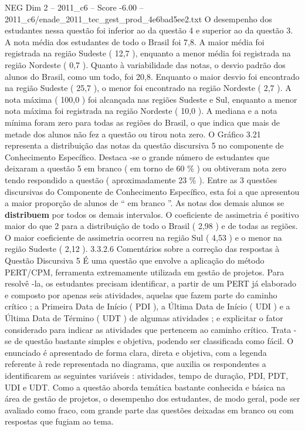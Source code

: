 \begin{textsample}{NEG Dim 2 – 2011\_c6 – Score -6.00 – 2011\_c6/enade\_2011\_tec\_gest\_prod\_4e6bad5ee2.txt}
O desempenho dos estudantes nessa questão foi inferior ao da questão 4 e superior ao da questão 3.
A nota média dos estudantes de todo o Brasil foi 7,8.
A maior média foi registrada na região Sudeste ( 12,7 ), enquanto a menor média foi registrada na região Nordeste ( 0,7 ).
Quanto à variabilidade das notas, o desvio padrão dos alunos do Brasil, como um todo, foi 20,8.
Enquanto o maior desvio foi encontrado na região Sudeste ( 25,7 ), o menor foi encontrado na região Nordeste ( 2,7 ).
A nota máxima ( 100,0 ) foi alcançada nas regiões Sudeste e Sul, enquanto a menor nota máxima foi registrada na região Nordeste ( 10,0 ).
A mediana e a nota mínima foram zero para todas as regiões do Brasil, o que indica que mais de metade dos alunos não fez a questão ou tirou nota zero.
O Gráfico 3.21 representa a distribuição das notas da questão discursiva 5 no componente de Conhecimento Específico.
Destaca -se o grande número de estudantes que deixaram a questão 5 em branco ( em torno de 60 \% ) ou obtiveram nota zero tendo respondido a questão ( aproximadamente 23 \% ).
Entre as 3 questões discursivas do Componente de Conhecimento Específico, esta foi a que apresentou a maior proporção de alunos de “ em branco ”.
As notas dos demais alunos se \textbf{distribuem} por todos os demais intervalos.
O coeficiente de assimetria é positivo maior do que 2 para a distribuição de todo o Brasil ( 2,98 ) e de todas as regiões.
O maior coeficiente de assimetria ocorreu na região Sul ( 4,53 ) e o menor na região Sudeste ( 2,12 ). 3.3.2.6 Comentários sobre a correção das respostas à Questão Discursiva 5 É uma questão que envolve a aplicação do método PERT/CPM, ferramenta extremamente utilizada em gestão de projetos.
Para resolvê -la, os estudantes precisam identificar, a partir de um PERT já elaborado e composto por apenas seis atividades, aquelas que fazem parte do caminho crítico ; a Primeira Data de Início ( PDI ), a Última Data de Início ( UDI ) e a Última Data de Término ( UDT ) de algumas atividades ; e explicitar o fator considerado para indicar as atividades que pertencem ao caminho crítico.
Trata -se de questão bastante simples e objetiva, podendo ser classificada como fácil.
O enunciado é apresentado de forma clara, direta e objetiva, com a legenda referente à rede representada no diagrama, que auxilia os respondentes a identificarem as seguintes variáveis : atividades, tempo de duração, PDI, PDT, UDI e UDT.
Como a questão aborda temática bastante conhecida e básica na área de gestão de projetos, o desempenho dos estudantes, de modo geral, pode ser avaliado como fraco, com grande parte das questões deixadas em branco ou com respostas que fugiam ao tema.

\end{textsample}
